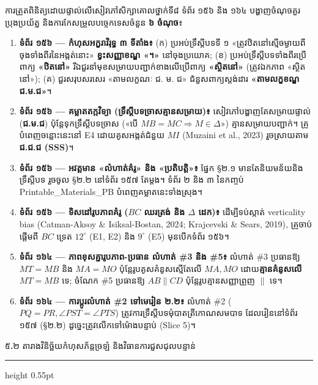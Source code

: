 \documentclass[a4paper,12pt]{article}
\newcommand{\en}[1]{{\TimesEn #1}}
\newcommand{\enbf}[1]{{\TimesEn\textbf{#1}}}
\newcommand{\ang}[1]{\ensuremath{\angle #1}}
\newcommand{\subsectitle}[1]{{\muol\fontsize{11pt}{14.5pt}\selectfont #1}}
\newcommand{\subsec}[1]{%
  \Needspace{1.6cm}%
  \vspace{4pt}%
  \subsectitle{#1}\par%
  \vspace{-2pt}%
  {\color{black}\hrule height 0.55pt}%
  \vspace{3.5pt}%
}
\begin{document}
ការត្រួតពិនិត្យដោយផ្ទាល់លើសៀវភៅសិក្សាគោលថ្នាក់ទី៨ ទំព័រ ១៥៦ និង ១៦៤ បង្ហាញចំណុចគួរប្រុងប្រយ័ត្ន និងការកែសម្រួលបច្ចេកទេសចំនួន \textbf{៦ ចំណុច}៖

\begin{enumerate}[leftmargin=0.65cm, itemsep=2.5pt]
  \item \textbf{ទំព័រ ១៥៦ — កំហុសអក្ខរាវិរុទ្ធ ៣ ទីតាំង៖} (ក) ប្រអប់ទ្រឹស្ដីបទទី ១ «ត្រូវឋិតនៅស្មើចម្ងាយពីចុងទាំងពីរនៃអង្កត់នោះ» \textbf{ខ្វះសញ្ញាខណ្ឌ «។»} នៅចុងប្រយោគ; (ខ) ប្រអប់ទ្រឹស្ដីបទទាំងពីរប្រើពាក្យ \textbf{«ឋិតនៅ»} រីឯជួរនាំមុខសម្រាយបញ្ជាក់ខាងលើប្រើពាក្យ \textbf{«ស្ថិតនៅ»} (ត្រូវឯកភាព «ស្ថិតនៅ»); (គ) ជួរសរុបសរសេរ «តាមលក្ខណៈ ជ. ម. ជ» ជំនួសពាក្យស្តង់ដារ \textbf{«តាមលក្ខខណ្ឌ ជ.ម.ជ»}។
  \item \textbf{ទំព័រ ១៥៦ — គម្លាតតក្កវិទ្យា (ទ្រឹស្ដីបទច្រាសគ្មានសម្រាយ)៖} សៀវភៅបង្ហាញតែសម្រាយផ្ទាល់ (\textbf{ជ.ម.ជ}) ប៉ុន្តែទុកទ្រឹស្ដីបទច្រាស («បើ $MB=MC \Rightarrow M\in\Delta$») គ្មានសម្រាយបញ្ជាក់។ គ្រូបំពេញចន្លោះនេះនៅ \en{E4} ដោយគូសអង្កត់ជំនួយ $MI$ \en{(Muzaini et al., 2023)} រួចស្រាយតាម \textbf{ជ.ជ.ជ (\en{SSS})}។
  \item \textbf{ទំព័រ ១៥៦ — អវត្តមាន «លំហាត់គំរូ» និង «ប្រតិបត្តិ»៖} ផ្នែក §២.១ មានតែនិយមន័យនិងទ្រឹស្ដីបទ រួចចូល §២.២ នៅទំព័រ ១៥៧ តែម្ដង។ ទំព័រ ២ និង ៣ នៃកញ្ចប់ \en{Printable\_Materials\_PB} បំពេញគម្លាតនេះទាំងស្រុង។
  \item \textbf{ទំព័រ ១៥៦ — ទិសដៅរូបភាពគំរូ ($BC$ ឈរត្រង់ និង $\Delta$ ដេក)៖} ដើម្បីទប់ស្កាត់ \en{verticality bias (Catman-Aksoy \& Isiksal-Bostan, 2024; Krajcevski \& Sears, 2019)}, គ្រូចាប់ផ្ដើមពី $BC$ ទ្រេត $12^\circ$ (\en{E1, E2}) និង $9^\circ$ (\en{E5}) មុនបើកទំព័រ ១៥៦។
  \item \textbf{ទំព័រ ១៦៤ — ភាពខុសគ្នារូបភាព-ប្រធាន លំហាត់ \en{\#3} និង \en{\#5}៖} លំហាត់ \en{\#3} ប្រធានឱ្យ $MT=MB$ និង $MA=MO$ ប៉ុន្តែរូបគូសគំនូសស្មើតែលើ $MA, MO$ ដោយ\textbf{គ្មានគំនូសលើ $MT=MB$} ទេ; ចំណែក \en{\#5} ប្រធានឱ្យ $AB\parallel CD$ ប៉ុន្តែរូបគ្មានសញ្ញាព្រួញ $\parallel$ ទេ។
  \item \textbf{ទំព័រ ១៦៤ — ការប្ដូរលំហាត់ \en{\#2} ទៅមេរៀន ២.២៖} លំហាត់ \en{\#2} ($PQ=PR, \ang{PST}=\ang{PTS}$) ត្រូវការទ្រឹស្ដីបទមុំបាតត្រីកោណសមបាទ ដែលរៀននៅទំព័រ ១៥៧ (§២.២) ដូច្នេះត្រូវលើកទៅម៉ោងបន្ទាប់ (\en{Slice 5})។
\end{enumerate}

\subsec{៥\enbf{.}២ តារាងវិនិច្ឆ័យកំហុសភ័ន្តច្រឡំ និងវិធានការជួសជុលបន្ទាន់}
\end{document}
